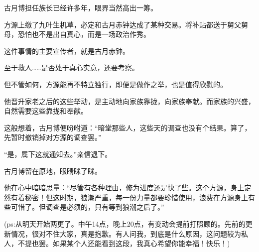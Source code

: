 \begin{this_body}
古月博担任族长已经许多年，眼界当然高出一筹。

方源上缴了九叶生机草，必定和古月赤钟达成了某种交易。将补贴都送于舅父舅母，恐怕也不是出自真心，而是一场政治作秀。

这件事情的主要宣传者，就是古月赤钟。

至于救人……是否处于真心实意，还要考察。

但不管如何，方源能再不特立独行，即便是做作之举，也是值得欣慰的。

他晋升家老之后的这些举动，是主动地向家族靠拢，向家族奉献。而家族的兴盛，自然需要这些靠拢和奉献。

这般想着，古月博便吩咐道：“暗堂那些人，这些天的调查也没有个结果。算了，先暂时撤销掉对方源的调查罢。”

“是，属下这就通知去。”亲信退下。

古月博留在原地，眼睛眯了眯。

他在心中暗暗思量：“尽管有各种理由，修为进度还是快了些。这个方源，身上定然有着秘密！但这时期，狼潮严重，每一份力量都要珍惜使用，浪费在方源身上有些可惜了。但调查是必须的，只有等到狼潮之后了。”

(ps:从明天开始两更了。中午14点，晚上20点，有变动会提前打照顾的。先前的更新情况，很对不住大家，真是抱歉。有人问我，到底是什么原因，这问题较为私人，不提也罢。如果某个人还能看到这段，我真心希望你能幸福！快乐！)

\end{this_body}


